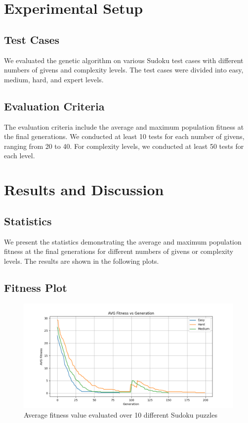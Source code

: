 \documentclass[12pt]{article}
\begin{document}
\section{Experimental Setup}
\subsection{Test Cases}
We evaluated the genetic algorithm on various 
Sudoku test cases with different numbers of 
givens and complexity levels. The test cases 
were divided into easy, medium, hard, and 
expert levels.

\subsection{Evaluation Criteria}
The evaluation criteria include the average and 
maximum population fitness at the final 
generations. We conducted at least 10 tests for 
each number of givens, ranging from 20 to 40. 
For complexity levels, we conducted at least 
50 tests for each level.

\section{Results and Discussion}
\subsection{Statistics}
We present the statistics demonstrating the 
average and maximum population fitness at the 
final generations for different numbers of 
givens or complexity levels. The results are 
shown in the following plots.

\subsection{Fitness Plot}
\begin{figure}[h]
    \centering
    \includegraphics[width=\textwidth]{figures/plot.png}
    \caption{Average fitness value evaluated over 10 different Sudoku puzzles}
    \label{fig:avg_fitness}
\end{figure}
\end{document}

